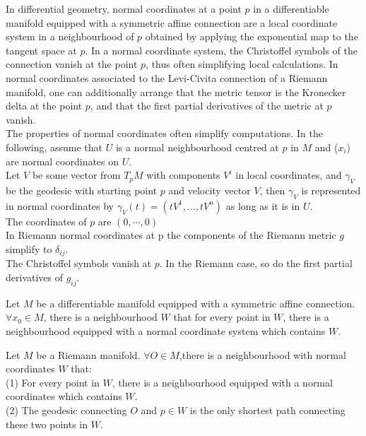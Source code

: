 \begin{newdef}
In differential geometry, normal coordinates at a point $p$ in a differentiable manifold equipped with a symmetric affine connection are a local coordinate system in a neighbourhood of $p$ obtained by applying the exponential map to the tangent space at $p$. In a normal coordinate system, the Christoffel symbols of the connection vanish at the point $p$, thus often simplifying local calculations. In normal coordinates associated to the Levi-Civita connection of a Riemann manifold, one can additionally arrange that the metric tensor is the Kronecker delta at the point $p$, and that the first partial derivatives of the metric at $p$ vanish.\\
The properties of normal coordinates often simplify computations. In the following, assume that $U$ is a normal neighbourhood centred at $p$ in $M$ and ($x_i$) are normal coordinates on $U$.\\
Let $V$ be some vector from $T_pM$ with components $V^i$ in local coordinates, and $\gamma_V$ be the geodesic with starting point $p$ and velocity vector $V$, then $\gamma_V$ is represented in normal coordinates by $\gamma _{V}(t)=(tV^{1},...,tV^{n})$ as long as it is in $U$.\\
The coordinates of $p$ are $(0, \cdots, 0)$\\
In Riemann normal coordinates at p the components of the Riemann metric $g$ simplify to $\delta _{ij}$.\\
The Christoffel symbols vanish at $p$. In the Riemann case, so do the first partial derivatives of $g_{ij}$.
\end{newdef}

\begin{newthem}
Let $M$ be a differentiable manifold equipped with a symmetric affine connection. $\forall x_0 \in M$, there is a neighbourhood $W$ that for every point in $W$, there is a neighbourhood equipped with a normal coordinate system which contains $W$.
\end{newthem}

\begin{newthem}
Let $M$ be a Riemann manifold. $\forall O \in M$,there is a neighbourhood with normal coordinates $W$ that:\\
(1) For every point in $W$, there is a neighbourhood equipped with a normal coordinates which contains $W$.\\
(2) The geodesic connecting $O$ and $p \in W$ is the only shortest path connecting these two points in $W$.
\end{newthem}

